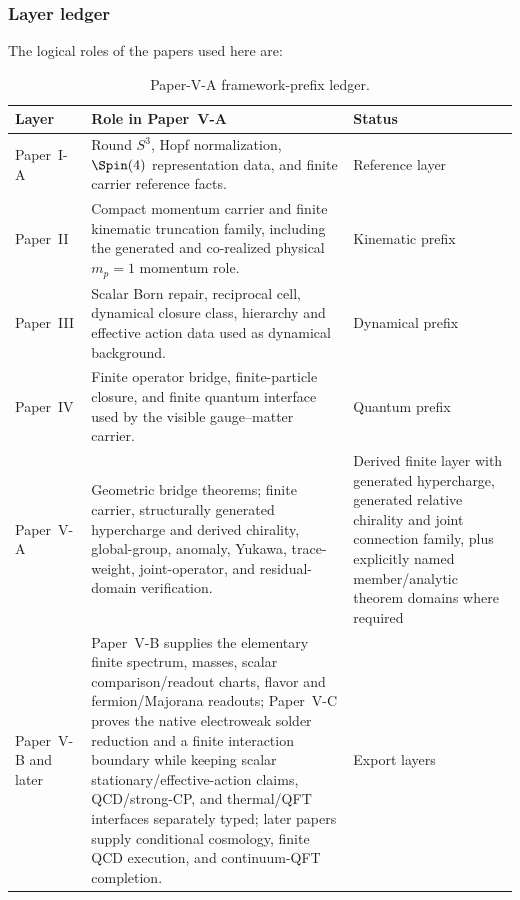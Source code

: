 \documentclass[12pt,a4paper]{article}
\begin{document}
\subsubsection{Layer ledger}
The logical roles of the papers used here are:
\begin{table}[H]
\centering
\caption[Paper-V-A framework-prefix ledger]{Paper-V-A framework-prefix ledger.}
\label{p5:tab:framework-prefix-ledger}
\footnotesize
\renewcommand{\arraystretch}{1.15}
\begin{tabularx}{\textwidth}{@{}p{}X p{}@{}}
\toprule
\textbf{Layer} & \textbf{Role in Paper~V-A} & \textbf{Status} \\
\midrule
Paper~I-A & Round \(S^3\), Hopf normalization, \(\Spin(4)\) representation data, and finite carrier reference facts. & Reference layer \\
Paper~II & Compact momentum carrier and finite kinematic truncation family, including the generated and co-realized physical \(m_p=1\) momentum role. & Kinematic prefix \\
Paper~III & Scalar Born repair, reciprocal cell, dynamical closure class, hierarchy and effective action data used as dynamical background. & Dynamical prefix \\
Paper~IV & Finite operator bridge, finite-particle closure, and finite quantum interface used by the visible gauge--matter carrier. & Quantum prefix \\
Paper~V-A & Geometric bridge theorems; finite carrier, structurally generated hypercharge and derived chirality, global-group, anomaly, Yukawa, trace-weight, joint-operator, and residual-domain verification. & Derived finite layer with generated hypercharge, generated relative chirality and joint connection family, plus explicitly named member/analytic theorem domains where required \\
Paper~V-B and later & Paper~V-B supplies the elementary finite spectrum, masses, scalar comparison/readout charts, flavor and fermion/Majorana readouts; Paper~V-C proves the native electroweak solder reduction and a finite interaction boundary while keeping scalar stationary/effective-action claims, QCD/strong-CP, and thermal/QFT interfaces separately typed; later papers supply conditional cosmology, finite QCD execution, and continuum-QFT completion. & Export layers \\
\bottomrule
\end{tabularx}
\end{table}
\end{document}
